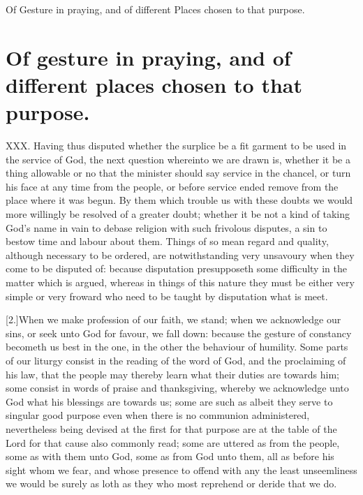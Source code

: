 Of Gesture in praying, and of different Places chosen to that purpose.
\section*{Of gesture in praying, and of different places chosen to that purpose.}
XXX. Having thus disputed whether the surplice be a fit garment to be used in the service of God, the next question whereinto we are drawn is, whether it be a thing allowable or no that the minister should say service in the chancel, or turn his face at any time from the people, or before service ended remove from the place where it was begun. By them which trouble us with these doubts we would more willingly be resolved of a greater doubt; whether it be not a kind of taking God’s name in vain to debase religion with such frivolous disputes, a sin to bestow time and labour about them. Things of so mean regard and quality, although necessary to be ordered, are notwithstanding very unsavoury when they come to be disputed of: because disputation presupposeth some difficulty in the matter which is argued, whereas in things of this nature they must be either very simple or very froward who need to be taught by disputation what is meet.

[2.]When we make profession of our faith, we stand; when we acknowledge our sins, or seek unto God for favour, we fall down: because the gesture of constancy becometh us best in the one, in the other the behaviour of humility. Some parts of our liturgy consist in the reading of the word of God,  and the proclaiming of his law, that the people may thereby learn what their duties are towards him;
 some consist in words of praise and thanksgiving, whereby we acknowledge unto God what his blessings are towards us; some are such as albeit they serve to singular good purpose even when there is no communion administered, nevertheless being devised at the first for that purpose are at the table of the Lord for that cause also commonly read; some are uttered as from the people, some as with them unto God, some as from God unto them, all as before his sight whom we fear, and whose presence to offend with any the least unseemliness we would be surely as loth as they who most reprehend or deride that we do.

